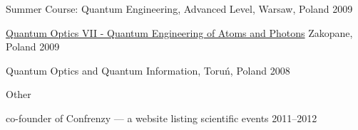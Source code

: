 \documentclass[margin,line]{resume}
\begin{document}
\begin{resume}
\begin{list2}
        \item {Summer Course: Quantum Engineering, Advanced Level}, Warsaw, Poland \hfill 2009
        \item \href{http://www.cft.edu.pl/QuantumOpticsVII/}{Quantum Optics VII - Quantum Engineering of Atoms and Photons} Zakopane, Poland \hfill 2009
        \item {Quantum Optics and Quantum Information}, Toruń, Poland \hfill 2008 
                \end{list2} 
       
     Other
	        \begin{list2}
	    \item co-founder of Confrenzy --- a website listing scientific events \hfill 2011--2012
                \end{list2} 



\vspace{3mm}


\end{resume}
\end{document}
